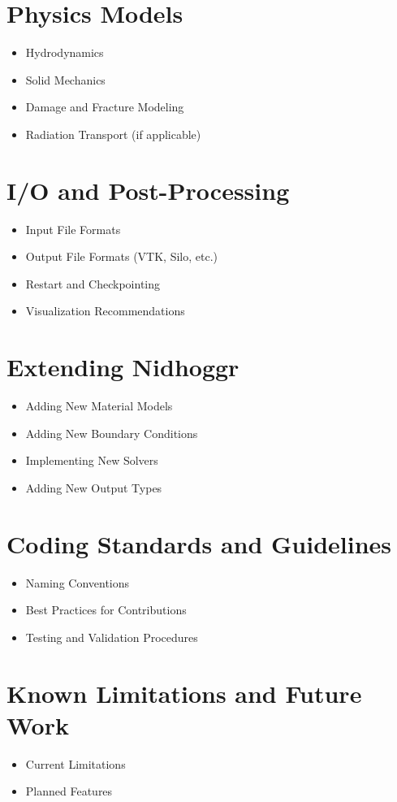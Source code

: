 \documentclass[12pt]{article}
\begin{document}
	\section{Physics Models}
	\begin{itemize}
		\item Hydrodynamics
		\item Solid Mechanics
		\item Damage and Fracture Modeling
		\item Radiation Transport (if applicable)
	\end{itemize}
	
	\section{I/O and Post-Processing}
	\begin{itemize}
		\item Input File Formats
		\item Output File Formats (VTK, Silo, etc.)
		\item Restart and Checkpointing
		\item Visualization Recommendations
	\end{itemize}
	
	\section{Extending Nidhoggr}
	\begin{itemize}
		\item Adding New Material Models
		\item Adding New Boundary Conditions
		\item Implementing New Solvers
		\item Adding New Output Types
	\end{itemize}
	
	\section{Coding Standards and Guidelines}
	\begin{itemize}
		\item Naming Conventions
		\item Best Practices for Contributions
		\item Testing and Validation Procedures
	\end{itemize}
	
	\section{Known Limitations and Future Work}
	\begin{itemize}
		\item Current Limitations
		\item Planned Features
	\end{itemize}
	
\end{document}
